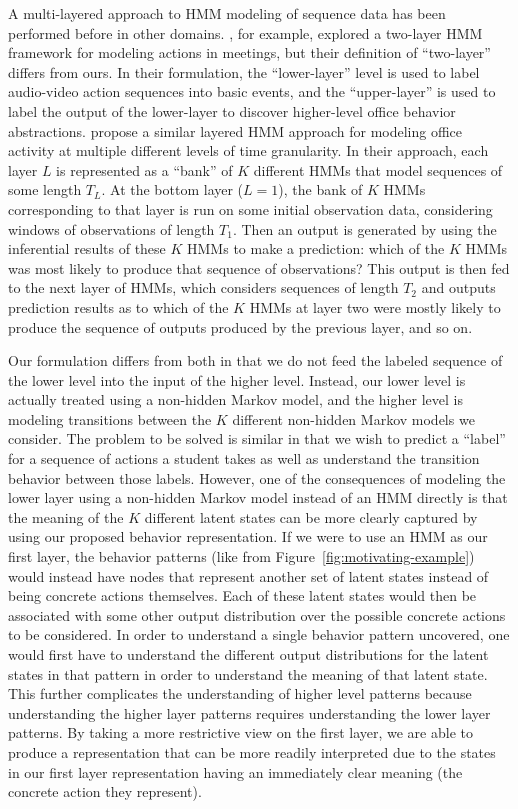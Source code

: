 A multi-layered approach to HMM modeling of sequence data has been
performed before in other domains. \citet{Zhang:2004:CVPR}, for example,
explored a two-layer HMM framework for modeling actions in meetings, but
their definition of ``two-layer'' differs from ours. In their formulation,
the ``lower-layer'' level is used to label audio-video action sequences
into basic events, and the ``upper-layer'' is used to label the output of
the lower-layer to discover higher-level office behavior abstractions.
\citet{Oliver:2004:CVIU} propose a similar layered HMM approach
for modeling office activity at multiple different levels of time
granularity. In their approach, each layer $L$ is represented as a ``bank''
of $K$ different HMMs that model sequences of some length $T_L$. At the
bottom layer ($L = 1$), the bank of $K$ HMMs corresponding to that layer is
run on some initial observation data, considering windows of observations
of length $T_1$. Then an output is generated by using the inferential
results of these $K$ HMMs to make a prediction: which of the $K$ HMMs was
most likely to produce that sequence of observations? This output is then
fed to the next layer of HMMs, which considers sequences of length $T_2$
and outputs prediction results as to which of the $K$ HMMs at layer two
were mostly likely to produce the sequence of outputs produced by the
previous layer, and so on.

Our formulation differs from both in that we do not feed the labeled
sequence of the lower level into the input of the higher level. Instead,
our lower level is actually treated using a non-hidden Markov model, and
the higher level is modeling transitions between the $K$ different
non-hidden Markov models we consider. The problem to be solved is similar
in that we wish to predict a ``label'' for a sequence of actions a student
takes as well as understand the transition behavior between those labels.
However, one of the consequences of modeling the lower layer using a
non-hidden Markov model instead of an HMM directly is that the meaning of
the $K$ different latent states can be more clearly captured by using our
proposed behavior representation. If we were to use an HMM as our first
layer, the behavior patterns (like from
Figure~\ref{fig:motivating-example}) would instead have nodes that
represent another set of latent states instead of being concrete actions
themselves. Each of these latent states would then be associated with some
other output distribution over the possible concrete actions to be
considered. In order to understand a single behavior pattern uncovered, one
would first have to understand the different output distributions for the
latent states in that pattern in order to understand the meaning of that
latent state. This further complicates the understanding of higher level
patterns because understanding the higher layer patterns requires
understanding the lower layer patterns. By taking a more restrictive view
on the first layer, we are able to produce a representation that can be
more readily interpreted due to the states in our first layer
representation having an immediately clear meaning (the concrete action
they represent).


